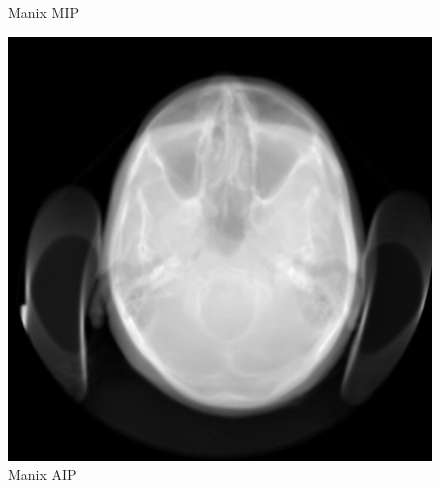 \documentclass[a4paper,11pt]{article}
\begin{document}
\begin{figure}[!h]
\begin{minipage}[c]{.22\linewidth}
	\caption{Manix MIP}
   \end{minipage} \hfill
   \begin{minipage}[c]{.22\linewidth}
      \center
	\includegraphics[scale=0.25]{manix_AIP.jpg}
	\caption{Manix AIP}
   \end{minipage} \hfill
\end{figure}
\end{document}
